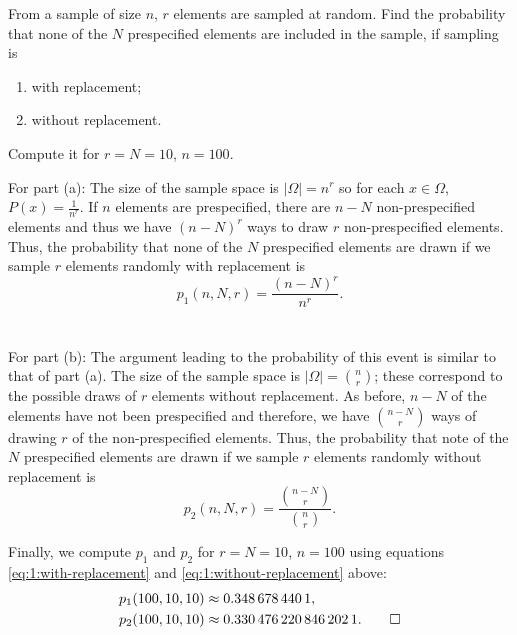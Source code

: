 \begin{problem}[Handout 1, \# 9]
  From a sample of size \(n\), \(r\) elements are sampled at random. Find
  the probability that none of the \(N\) prespecified elements are included
  in the sample, if sampling is
  \begin{enumerate}[label=(\alph*),noitemsep]
  \item with replacement;
  \item without replacement.
  \end{enumerate}
  Compute it for \(r=N=10\), \(n=100\).
\end{problem}
\begin{solution*}
  For part (a): The size of the sample space is \(|\Omega|=n^r\) so for
  each \(x\in\Omega\), \(P(x)=\frac{1}{n^r}\). If \(n\) elements are
  prespecified, there are \(n-N\) non-prespecified elements and thus we
  have \((n-N)^r\) ways to draw \(r\) non-prespecified elements. Thus, the
  probability that none of the \(N\) prespecified elements are drawn if we
  sample \(r\) elements randomly with replacement is
  \begin{equation}
    \label{eq:1:with-replacement}
    p_1(n,N,r)=\frac{(n-N)^r}{n^r}.
  \end{equation}
  \\\\
  For part (b): The argument leading to the probability of this event is
  similar to that of part (a). The size of the sample space is
  \(|\Omega|=\binom{n}{r}\); these correspond to the possible draws of
  \(r\) elements without replacement. As before, \(n-N\) of the elements
  have not been prespecified and therefore, we have \(\binom{n-N}{r}\) ways
  of drawing \(r\) of the non-prespecified elements. Thus, the probability
  that note of the \(N\) prespecified elements are drawn if we sample \(r\)
  elements randomly without replacement is
  \begin{equation}
    \label{eq:1:without-replacement}
    p_2(n,N,r)=\frac{\binom{n-N}{r}}{\binom{n}{r}}.
  \end{equation}

  Finally, we compute \(p_1\) and \(p_2\) for \(r=N=10\), \(n=100\) using
  equations \eqref{eq:1:with-replacement} and
  \eqref{eq:1:without-replacement} above:
  \begin{align*}
    p_1(100,10,10)&\approx\num{0.3486784401},\\
    p_2(100,10,10)&\approx\num{0.3304762208462021}.\qedhere
  \end{align*}
\end{solution*}

